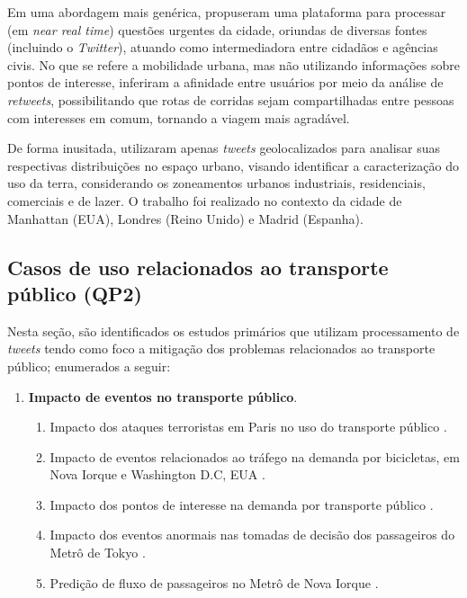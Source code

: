 \documentclass[
	12pt,				%
	oneside,			%
	a4paper,			%
	english,			%
	brazil				%
	]{abntex2ppgsi}
\begin{document}
{{Em uma abordagem mais genérica, \cite{Mukherjee2015} propuseram uma plataforma para processar (em \textit{near real time}) questões urgentes da cidade, oriundas de diversas fontes (incluindo o \textit{Twitter}), atuando como intermediadora entre cidadãos e agências civis. No que se refere a mobilidade urbana, mas não utilizando informações sobre pontos de interesse, \cite{Yousaf2014} inferiram a afinidade entre usuários por meio da análise de \textit{retweets}, possibilitando que rotas de corridas sejam compartilhadas entre pessoas com interesses em comum, tornando a viagem mais agradável.

De forma inusitada, \cite{Frias-Martinez2014} utilizaram apenas \textit{tweets} geolocalizados para analisar suas respectivas distribuições no espaço urbano, visando identificar a caracterização do uso da terra, considerando os zoneamentos urbanos industriais, residenciais, comerciais e de lazer. O trabalho foi realizado no contexto da cidade de Manhattan (EUA), Londres (Reino Unido) e Madrid (Espanha).

\subsection{Casos de uso relacionados ao transporte público (QP2)}
Nesta seção, são identificados os estudos primários que utilizam processamento de \textit{tweets} tendo como foco a mitigação dos problemas relacionados ao transporte público; enumerados a seguir:
\begin{enumerate}
\item \textbf{Impacto de eventos no transporte público}.
\begin{enumerate}
\item Impacto dos ataques terroristas em Paris no uso do transporte público \cite{Wen2016}.
\item Impacto de eventos relacionados ao tráfego na demanda por bicicletas, em Nova Iorque e Washington D.C, EUA \cite{Chen2016}.
\item Impacto dos pontos de interesse na demanda por transporte público \cite{Maghrebi2015}.
\item Impacto dos eventos anormais nas tomadas de decisão dos passageiros do Metrô de Tokyo \cite{Itoh2016}.
\item Predição de fluxo de passageiros no Metrô de Nova Iorque \cite{Ni2016}.
\end{enumerate}


\end{enumerate}}}
\end{document}
